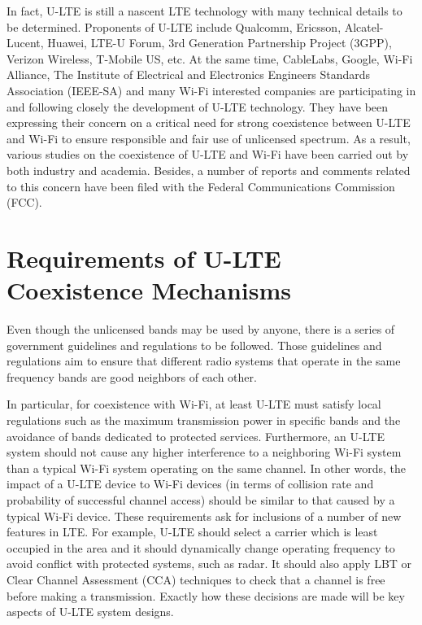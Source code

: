 In fact, U-LTE is still a nascent LTE technology with many technical details to be determined. Proponents of U-LTE include Qualcomm, Ericsson, Alcatel-Lucent, Huawei, LTE-U Forum, 3rd Generation Partnership Project (3GPP), Verizon Wireless, T-Mobile US, etc. At the same time, CableLabs, Google, Wi-Fi Alliance, The Institute of Electrical and Electronics Engineers Standards Association (IEEE-SA) and many Wi-Fi interested companies are participating in and following closely the development of U-LTE technology. They have been expressing their concern on a critical need for strong coexistence between U-LTE and Wi-Fi to ensure responsible and fair use of unlicensed spectrum. As a result, various studies on the coexistence of U-LTE and Wi-Fi have been carried out by both industry and academia. Besides, a number of reports and comments related to this concern have been filed with the Federal Communications Commission (FCC).


\section{Requirements of U-LTE Coexistence Mechanisms}
\label{reqs}

Even though the unlicensed bands may be used by anyone, there is a series of government guidelines and regulations to be followed. Those guidelines and regulations aim to ensure that different radio systems that operate in the same frequency bands are good neighbors of each other.

In particular, for coexistence with Wi-Fi, at least U-LTE must satisfy local regulations such as the maximum transmission power in specific bands and the avoidance of bands dedicated to protected services. Furthermore, an U-LTE system should not cause any higher interference to a neighboring Wi-Fi system than a typical Wi-Fi system operating on the same channel. In other words, the impact of a U-LTE device to Wi-Fi devices (in terms of collision rate and probability of successful channel access) should be similar to that caused by a typical Wi-Fi device. These requirements ask for inclusions of a number of new features in LTE. For example, U-LTE should select a carrier which is least occupied in the area and it should dynamically change operating frequency to avoid conflict with protected systems, such as radar. It should also apply LBT or Clear Channel Assessment (CCA) techniques to check that a channel is free before making a transmission. Exactly how these decisions are made will be key aspects of U-LTE system designs.


